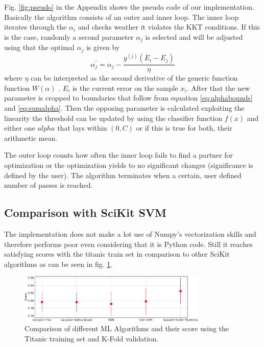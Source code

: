 Fig. \ref{fig:pseudo} in the Appendix shows the pseudo code of our implementation. Basically the algorithm consists of an outer and inner loop. The inner loop iterates through the $\alpha _i$ and checks weather it violates the KKT conditions. If this is the case, randomly a second parameter $\alpha _j$ is selected and will be adjusted using that the optimal $\alpha _j$ is given by
\begin{equation}
\alpha^{'}_j = \alpha _j  - \frac{y^{(j)} (E_i - E_j)}{\eta}
\end{equation}
where $\eta$ can be interpreted as the second derivative of the generic function function $W(\alpha)$ \cite{smo}. $E_i$ is the current error on the sample $x_i$. After that the new parameter is cropped to boundaries that follow from equation \ref{eq:alphabounds} and \ref{eq:sumalpha}. Then the opposing parameter is calculated exploiting the linearity the threshold can be updated by using the classifier function $f(x)$ and either one $alpha$ that lays within $(0, C)$ or if this is true for both, their arithmetic mean.

The outer loop counts how often the inner loop fails to find a partner for optimization or the optimization yields to no significant changes (significance is defined by the user). The algorithm terminates when a certain, user defined number of passes is reached.

\subsection{Comparison with SciKit SVM}
The implementation does not make a lot use of Numpy's vectorization skills and therefore performs poor even considering that it is Python code. Still it reaches satisfying scores with the titanic train set in comparison to other SciKit algorithms as can be seen in fig. \ref{fig:comparison}.

\begin{figure}
  \centering
    \includegraphics[width=0.8\textwidth]{media_saved/ml_comparison}
  \caption{Comparison of different ML Algorithms and their score using the Titanic training set and K-Fold validation.}  
  \label{fig:comparison}  
\end{figure}

